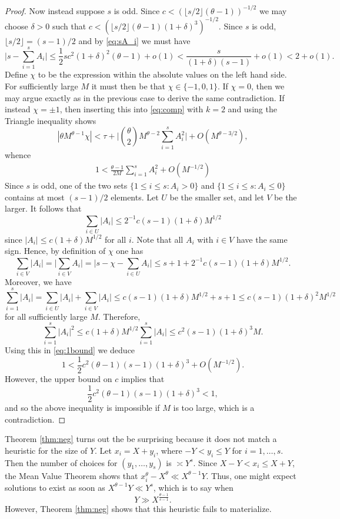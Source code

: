 \documentclass[11pt,reqno]{amsart}
\numberwithin{equation}{section}
\begin{document}
\begin{proof}
Now instead suppose $s$ is odd. Since $c < (\lfloor s/2 \rfloor(\theta-1))^{-1/2}$ we may choose $\delta > 0$ such that $c < (\lfloor s/2 \rfloor(\theta-1)(1+\delta)^3)^{-1/2}$. Since $s$ is odd, $\lfloor s/2 \rfloor = (s-1)/2$ and by \eqref{eq:sA_i} we must have 
\[ \Big|s-\sum_{i=1}^s A_i\Big| \leq \frac{1}{2}sc^2(1+\delta)^2(\theta-1)+o(1) < \frac{s}{(1+\delta)(s-1)}+o(1) < 2+o(1). \]
Define $\chi$ to be the expression within the absolute values on the left hand side. For sufficiently large $M$ it must then be that $\chi \in \{ -1, 0 , 1\}$. If $\chi = 0$, then we may argue exactly as in the previous case to derive the same contradiction. If instead $\chi = \pm 1$, then inserting this into \eqref{eq:comp} with $k = 2$ and using the Triangle inequality shows 
\[ |\theta M^{\theta-1}\chi| < \tau +\Big| \binom{\theta}{2} M^{\theta-2} \sum_{i=1}^s A_i^2\Big|+O(M^{\theta-3/2}), \]
whence 
\begin{align} \label{eq:1bound}
1 < \frac{\theta-1}{2M}\sum_{i=1}^sA_i^2+O(M^{-1/2})
\end{align}
Since $s$ is odd, one of the two sets $\{1 \leq i \leq s: A_i > 0\}$ and $\{1 \leq i \leq s :A_i \leq 0\}$ contains at most $(s-1)/2$ elements. Let $U$ be the smaller set, and let $V$ be the larger. It follows that 
\[ \sum_{i \in U} |A_i| \leq 2^{-1}c(s-1)(1+\delta)M^{1/2} \]
since $|A_i| \leq c(1+\delta)M^{1/2}$ for all $i$. Note that all $A_i$ with $i \in V$ have the same sign. Hence, by definition of $\chi$ one has 
\[ \sum_{i \in V} |A_i| = \big|\sum_{i \in V} A_i\big| = \big|s-\chi-\sum_{i \in U} A_i\big| \leq s+1+2^{-1}c(s-1)(1+\delta)M^{1/2}. \] 
Moreover, we have 
\[ \sum_{i=1}^s |A_i| = \sum_{i \in U} |A_i| +\sum_{i \in V} |A_i| \leq c(s-1)(1+\delta)M^{1/2}+s+1 \leq c(s-1)(1+\delta)^2M^{1/2} \]
for all sufficiently large $M$. Therefore, 
\[ \sum_{i=1}^s |A_i|^2 \leq c(1+\delta)M^{1/2}\sum_{i=1}^s |A_i| \leq c^2(s-1)(1+\delta)^3M. \]
Using this in \eqref{eq:1bound} we deduce 
\[ 1 < \frac{1}{2}c^2(\theta-1)(s-1)(1+\delta)^3+O(M^{-1/2}). \]
However, the upper bound on $c$ implies that 
\[ \frac{1}{2}c^2(\theta-1)(s-1)(1+\delta)^3 < 1, \]
and so the above inequality is impossible if $M$ is too large, which is a contradiction. 
\end{proof} 

Theorem \ref{thm:neg} turns out the be surprising because it does not match a heuristic for the size of $Y$. Let $x_i = X+y_i$, where $-Y < y_i \leq Y$ for $i = 1,\ldots,s$. Then the number of choices for $(y_1,\ldots,y_s)$ is $\asymp Y^s$. Since $X-Y < x_i \leq X+Y$, the Mean Value Theorem shows that $x_i^{\theta} - X^{\theta} \ll X^{\theta-1}Y $. Thus, one might expect solutions to exist as soon as $X^{\theta-1}Y \ll Y^s$, which is to say when
\[ Y \gg X^{\frac{\theta-1}{s-1}}. \]
However, Theorem \ref{thm:neg} shows that this heuristic fails to materialize. 
\end{document}
